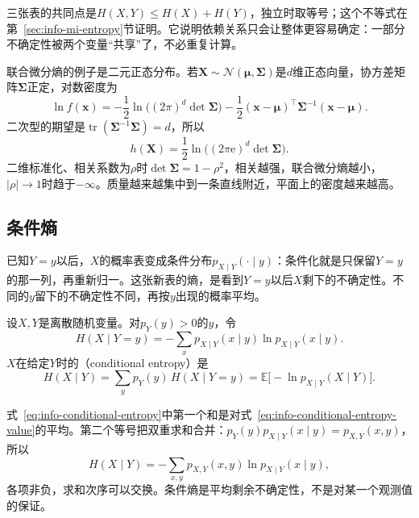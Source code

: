 三张表的共同点是$H(X,Y)\leq H(X)+H(Y)$，独立时取等号；这个不等式在第~\ref{sec:info-mi-entropy}节证明。它说明依赖关系只会让整体更容易确定：一部分不确定性被两个变量“共享”了，不必重复计算。

联合微分熵的例子是二元正态分布。若$\bm{X}\sim\mathcal{N}(\bm{\mu},\bm{\Sigma})$是$d$维正态向量，协方差矩阵$\bm{\Sigma}$正定，对数密度为
\[
  \ln f(\bm{x})=-\frac12\ln\bigl((2\pi)^{d}\det\bm{\Sigma}\bigr)-\frac12(\bm{x}-\bm{\mu})^{\top}\bm{\Sigma}^{-1}(\bm{x}-\bm{\mu}).
\]
二次型的期望是$\operatorname{tr}(\bm{\Sigma}^{-1}\bm{\Sigma})=d$，所以
\begin{equation}
  h(\bm{X})=\frac12\ln\bigl((2\pi\mathrm{e})^{d}\det\bm{\Sigma}\bigr).
  \label{eq:info-gaussian-vector-entropy}
\end{equation}
二维标准化、相关系数为$\rho$时$\det\bm{\Sigma}=1-\rho^{2}$，相关越强，联合微分熵越小，$\lvert\rho\rvert\to1$时趋于$-\infty$。质量越来越集中到一条直线附近，平面上的密度越来越高。

\subsection{条件熵}
\label{sec:info-conditional-entropy}

已知$Y=y$以后，$X$的概率表变成条件分布$p_{X\mid Y}(\cdot\mid y)$：条件化就是只保留$Y=y$的那一列，再重新归一。这张新表的熵，是看到$Y=y$以后$X$剩下的不确定性。不同的$y$留下的不确定性不同，再按$y$出现的概率平均。

\begin{definition}[条件熵]
\label{def:info-conditional-entropy}
设$X,Y$是离散随机变量。对$p_Y(y)>0$的$y$，令
\begin{equation}
  H(X\mid Y=y)=-\sum_xp_{X\mid Y}(x\mid y)\ln p_{X\mid Y}(x\mid y).
  \label{eq:info-conditional-entropy-value}
\end{equation}
$X$在给定$Y$时的（conditional entropy）是
\begin{equation}
  H(X\mid Y)=\sum_{y}p_Y(y)\,H(X\mid Y=y)=\mathbb{E}\bigl[-\ln p_{X\mid Y}(X\mid Y)\bigr].
  \label{eq:info-conditional-entropy}
\end{equation}
\end{definition}

式~\eqref{eq:info-conditional-entropy}中第一个和是对式~\eqref{eq:info-conditional-entropy-value}的平均。第二个等号把双重求和合并：$p_Y(y)p_{X\mid Y}(x\mid y)=p_{X,Y}(x,y)$，所以
\[
  H(X\mid Y)=-\sum_{x,y}p_{X,Y}(x,y)\ln p_{X\mid Y}(x\mid y),
\]
各项非负，求和次序可以交换。条件熵是平均剩余不确定性，不是对某一个观测值的保证。

